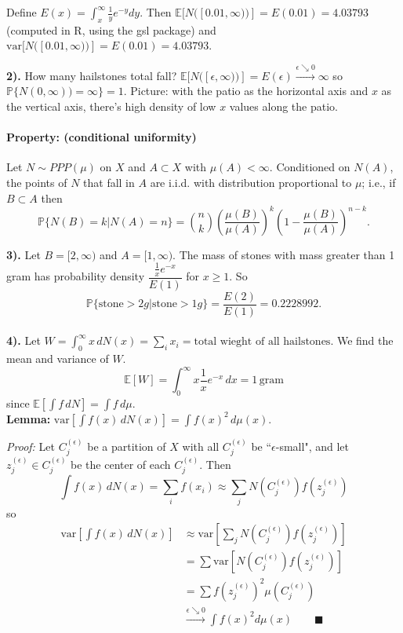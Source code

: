 \documentclass{article}
\begin{document}
Define $E(x)=\int_x^\infty\frac{1}{y}e^{-y}dy$. 
Then $\mathbb{E}[N([0.01,\infty))]=E(0.01)=4.03793$ 
(computed in R, using the gsl package)
and $\textrm{var}[N([0.01,\infty))]=E(0.01)=4.03793$.

\textbf{2).} 
How many hailstones total fall? 
$\mathbb{E}[N([\epsilon,\infty))]=E(\epsilon)\xrightarrow{\epsilon\searrow0}\infty$ so $\mathbb{P}\{N(0,\infty))=\infty\}=1$. 
Picture: with the patio as the horizontal axis and $x$ as the vertical axis, there's high density of low $x$ values along the patio.

\paragraph{Property: (conditional uniformity)} 
Let $N\sim PPP(\mu)$ on $X$ and $A\subset X$ with $\mu(A)<\infty$. 
Conditioned on $N(A)$, the points of $N$ that fall in $A$ are i.i.d. with distribution proportional to $\mu$; 
i.e., if $B\subset A$ then 
$$\mathbb{P}\{N(B)=k | N(A)=n\} = {{n}\choose{k}} \left(\frac{\mu(B)}{\mu(A)}\right)^k\left( 1-\frac{\mu(B)}{\mu(A)}\right)^{n-k}.$$

\textbf{3).} 
Let $B=[2,\infty)$ and $A=[1,\infty)$. 
The mass of stones with mass greater than 1 gram has probability density $\dfrac{\frac{1}{x}e^{-x}}{E(1)}$ for $x\geq 1$. 
So $$\mathbb{P}\{\textrm{stone}>2g|\textrm{stone}>1g\}=\dfrac{E(2)}{E(1)}=0.2228992.$$\\

\textbf{4).} 
Let $W=\int_0^\infty x\,dN(x)=\sum_ix_i=\textrm{total wieght of all hailstones}$. 
We find the mean and variance of $W$. 
$$\mathbb{E}[W]=\int_0^\infty x\frac{1}{x}e^{-x}\,dx=1\,\textrm{gram}$$
since $\mathbb{E}[\int f\,dN]=\int f\,d\mu$.\\

\textbf{Lemma:} $\textrm{var}[\int f(x)\,dN(x)]=\int f(x)^2\,d\mu(x)$.

\textit{Proof:} 
Let $C_j^{(\epsilon)}$ be a partition of $X$ with all $C_j^{(\epsilon)}$ be ``$\epsilon$-small", 
and let $z_j^{(\epsilon)}\in C_j^{(\epsilon)}$ be the center of each $C_j^{(\epsilon)}$. Then
$$\int f(x)\,dN(x)=\sum_if(x_i)\approx\sum_j N(C_j^{(\epsilon)})f(z_j^{(\epsilon)})$$
so 
$$\begin{split}
    \textrm{var}\left[  \int f(x)\,dN(x) \right] &\approx \textrm{var}\left[\sum_j N(C_j^{(\epsilon)})f(z_j^{(\epsilon)}) \right]\\
        &=\sum\textrm{var}[ N(C_j^{(\epsilon)})f(z_j^{(\epsilon)})]\\
        &=\sum f(z_j^{(\epsilon)})^2\mu(C_j^{(\epsilon)})\\
        &\xrightarrow{\epsilon\searrow0}\int f(x)^2d\mu(x)   \qquad \blacksquare
\end{split}$$
\end{document}
